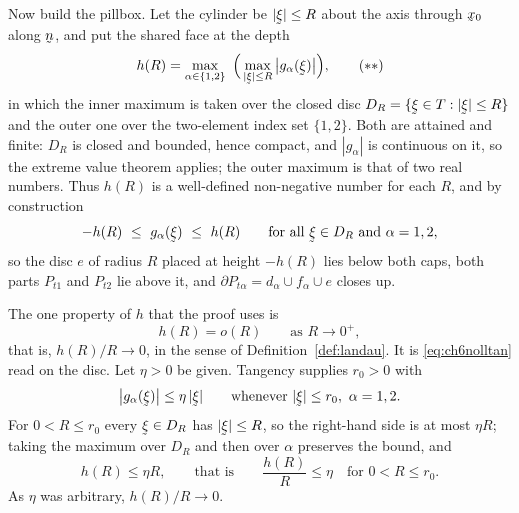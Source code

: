 Now build the pillbox. Let the cylinder be $|\vek{\xi}|\le R$ about the
axis through $\bx_{0}$ along $\bn$, and put the shared face at the depth
\begin{equation}
   h(R)=\max_{\alpha\in\{1,2\}}\ \Big(
   \max_{|\vek{\xi}|\le R}\big|g_{\alpha}(\vek{\xi})\big|\Big),
   \tag{$\ast\ast$}\label{eq:ch6nollhdef}
\end{equation}
in which the inner maximum is taken over the closed disc
$D_{R}=\{\vek{\xi}\in T:|\vek{\xi}|\le R\}$ and the outer one over the
two-element index set $\{1,2\}$. Both are attained and finite: $D_{R}$
is closed and bounded, hence compact, and $|g_{\alpha}|$ is continuous
on it, so the extreme value theorem applies; the outer maximum is that
of two real numbers. Thus $h(R)$ is a well-defined non-negative number
for each $R$, and by construction
\[
   -h(R)\ \le\ g_{\alpha}(\vek{\xi})\ \le\ h(R)
   \qquad\text{for all }\vek{\xi}\in D_{R}\text{ and }\alpha=1,2 ,
\]
so the disc $e$ of radius $R$ placed at height $-h(R)$ lies below both
caps, both parts $P_{t1}$ and $P_{t2}$ lie above it, and
$\partial P_{t\alpha}=d_{\alpha}\cup f_{\alpha}\cup e$ closes up.

The one property of $h$ that the proof uses is
\begin{equation}
   h(R)=o(R)\qquad\text{as }R\to0^{+},
   \tag{$\ast\ast\ast$}\label{eq:ch6nollh}
\end{equation}
that is, $h(R)/R\to0$, in the sense of Definition~\ref{def:landau}. It
is \eqref{eq:ch6nolltan} read on the disc. Let $\eta>0$ be given.
Tangency supplies $r_{0}>0$ with
\[
   \big|g_{\alpha}(\vek{\xi})\big|\le\eta\,|\vek{\xi}|
   \qquad\text{whenever }|\vek{\xi}|\le r_{0},\ \alpha=1,2 .
\]
For $0<R\le r_{0}$ every $\vek{\xi}\in D_{R}$ has $|\vek{\xi}|\le R$,
so the right-hand side is at most $\eta R$; taking the maximum over
$D_{R}$ and then over $\alpha$ preserves the bound, and
\[
   h(R)\le\eta R ,\qquad\text{that is}\qquad
   \frac{h(R)}{R}\le\eta\quad\text{for }0<R\le r_{0} .
\]
As $\eta$ was arbitrary, $h(R)/R\to0$.

